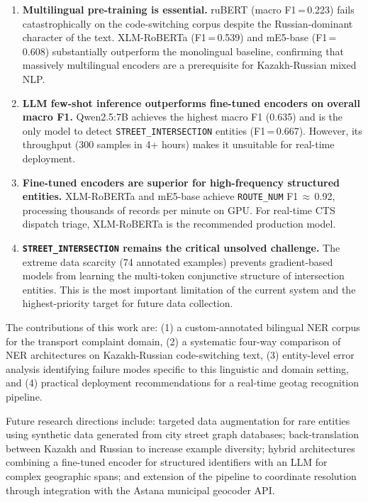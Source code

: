 \begin{enumerate}
  \item \textbf{Multilingual pre-training is essential.} ruBERT (macro F1\,=\,0.223) fails catastrophically on the code-switching corpus despite the Russian-dominant character of the text. XLM-RoBERTa (F1\,=\,0.539) and mE5-base (F1\,=\,0.608) substantially outperform the monolingual baseline, confirming that massively multilingual encoders are a prerequisite for Kazakh-Russian mixed NLP.

  \item \textbf{LLM few-shot inference outperforms fine-tuned encoders on overall macro F1.} Qwen2.5:7B achieves the highest macro F1 (0.635) and is the only model to detect \texttt{STREET\_INTERSECTION} entities (F1\,=\,0.667). However, its throughput (300 samples in 4+ hours) makes it unsuitable for real-time deployment.

  \item \textbf{Fine-tuned encoders are superior for high-frequency structured entities.} XLM-RoBERTa and mE5-base achieve \texttt{ROUTE\_NUM} F1\,$\approx$\,0.92, processing thousands of records per minute on GPU. For real-time CTS dispatch triage, XLM-RoBERTa is the recommended production model.

  \item \textbf{\texttt{STREET\_INTERSECTION} remains the critical unsolved challenge.} The extreme data scarcity (74 annotated examples) prevents gradient-based models from learning the multi-token conjunctive structure of intersection entities. This is the most important limitation of the current system and the highest-priority target for future data collection.
\end{enumerate}

The contributions of this work are: (1) a custom-annotated bilingual NER corpus for the transport complaint domain, (2) a systematic four-way comparison of NER architectures on Kazakh-Russian code-switching text, (3) entity-level error analysis identifying failure modes specific to this linguistic and domain setting, and (4) practical deployment recommendations for a real-time geotag recognition pipeline.

Future research directions include: targeted data augmentation for rare entities using synthetic data generated from city street graph databases; back-translation between Kazakh and Russian to increase example diversity; hybrid architectures combining a fine-tuned encoder for structured identifiers with an LLM for complex geographic spans; and extension of the pipeline to coordinate resolution through integration with the Astana municipal geocoder API.
